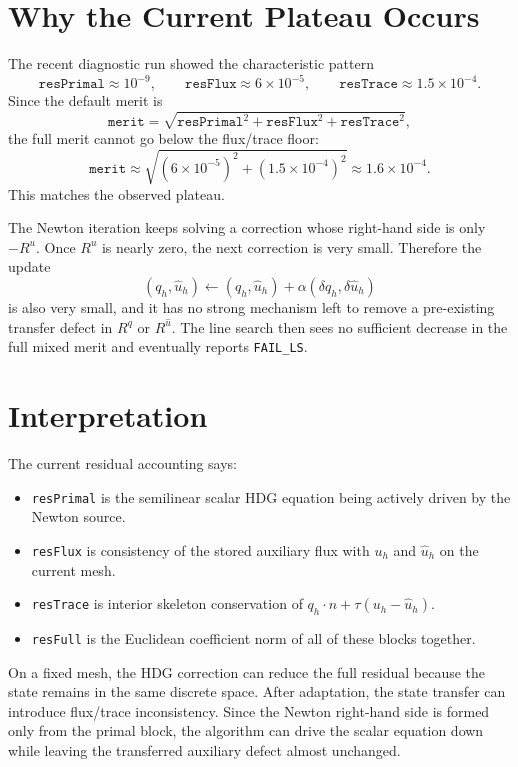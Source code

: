 \documentclass[11pt]{article}
\newcommand{\uhat}{\widehat u}
\begin{document}
\section{Why the Current Plateau Occurs}

The recent diagnostic run showed the characteristic pattern
\[
  \texttt{resPrimal}\approx 10^{-9},
  \qquad
  \texttt{resFlux}\approx 6\times 10^{-5},
  \qquad
  \texttt{resTrace}\approx 1.5\times 10^{-4}.
\]
Since the default merit is
\[
  \texttt{merit}
  =
  \sqrt{
    \texttt{resPrimal}^2
    +
    \texttt{resFlux}^2
    +
    \texttt{resTrace}^2
  },
\]
the full merit cannot go below the flux/trace floor:
\[
  \texttt{merit}
  \approx
  \sqrt{
    (6\times 10^{-5})^2
    +
    (1.5\times 10^{-4})^2
  }
  \approx
  1.6\times 10^{-4}.
\]
This matches the observed plateau.

The Newton iteration keeps solving a correction whose right-hand side is
only \(-R^u\).  Once \(R^u\) is nearly zero, the next correction is very
small.  Therefore the update
\[
  (q_h,\uhat_h)
  \leftarrow
  (q_h,\uhat_h)+\alpha(\delta q_h,\delta\uhat_h)
\]
is also very small, and it has no strong mechanism left to remove a
pre-existing transfer defect in \(R^q\) or \(R^{\widehat u}\).  The line
search then sees no sufficient decrease in the full mixed merit and
eventually reports \texttt{FAIL\_LS}.

\section{Interpretation}

The current residual accounting says:
\begin{itemize}
  \item \texttt{resPrimal} is the semilinear scalar HDG equation being
  actively driven by the Newton source.
  \item \texttt{resFlux} is consistency of the stored auxiliary flux
  with \(u_h\) and \(\uhat_h\) on the current mesh.
  \item \texttt{resTrace} is interior skeleton conservation of
  \(q_h\cdot n+\tau(u_h-\uhat_h)\).
  \item \texttt{resFull} is the Euclidean coefficient norm of all of
  these blocks together.
\end{itemize}

On a fixed mesh, the HDG correction can reduce the full residual because
the state remains in the same discrete space.  After adaptation, the
state transfer can introduce flux/trace inconsistency.  Since the Newton
right-hand side is formed only from the primal block, the algorithm can
drive the scalar equation down while leaving the transferred auxiliary
defect almost unchanged.
\end{document}
